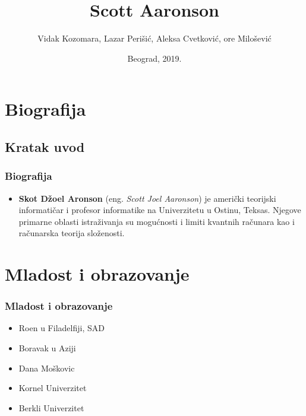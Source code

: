 \documentclass{beamer}
\def\dJ{{\fontencoding{T1}\selectfont\dj}}
\def\Dj{{\fontencoding{T1}\selectfont\DJ}}
\begin{document}
\title{Scott Aaronson}
\author{Vidak Kozomara, Lazar Perišić, Aleksa Cvetković, \newline \Dj{}or\dJ{}e Milošević}
\date{
	\footnotesize{Beograd, 2019.}	
}

\begin{frame}
	\thispagestyle{empty}
	\titlepage
\end{frame}

\addtocounter{framenumber}{-1}
\section{Biografija}
\subsection{Kratak uvod}
\begin{frame}[fragile]
    \frametitle{Biografija}
	\begin{itemize}
		\item \textbf{Skot Džoel Aronson} (eng. \textit{Scott Joel Aaronson}) je američki teorijski informatičar i profesor informatike na Univerzitetu u Ostinu, Teksas. Njegove primarne oblasti istraživanja su mogućnosti i limiti kvantnih računara kao i računarska teorija složenosti.
	\end{itemize}
\end{frame}
\section{Mladost i obrazovanje}
\begin{frame}
	\frametitle{Mladost i obrazovanje} 
	\begin{itemize}
	    \item Ro\dJ{}en u Filadelfiji, SAD
	    \item Boravak u Aziji
	    \item Dana Moškovic
	    \item Kornel Univerzitet
	    \item Berkli Univerzitet
	    
	\end{itemize}
\end{frame}
\end{document}
